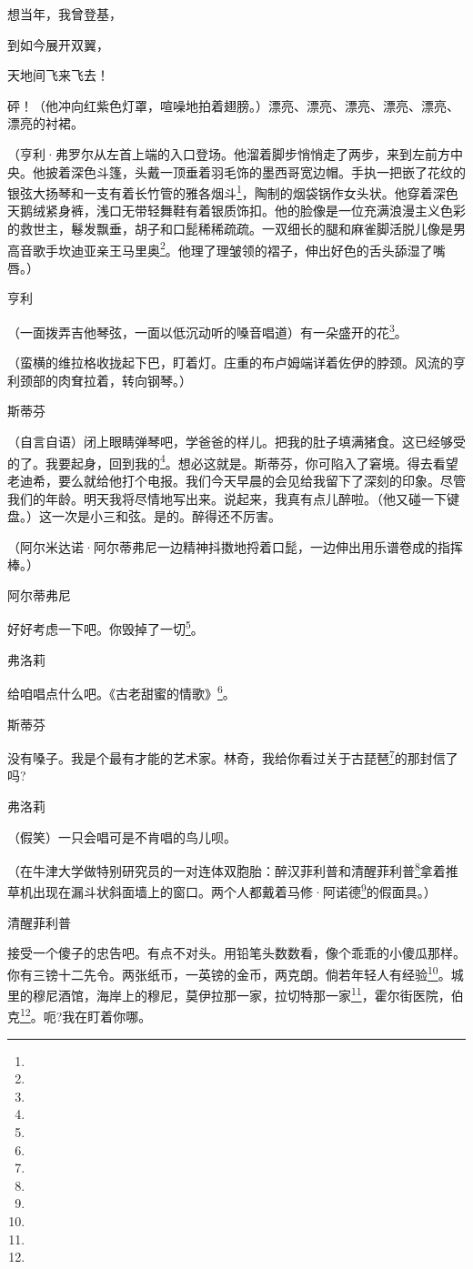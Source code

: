 \par 想当年，我曾登基，
\par 到如今展开双翼，
\par 天地间飞来飞去！
\par 砰！（他冲向红紫色灯罩，喧噪地拍着翅膀。）漂亮、漂亮、漂亮、漂亮、漂亮、漂亮的衬裙。
\par （亨利·弗罗尔从左首上端的入口登场。他溜着脚步悄悄走了两步，来到左前方中央。他披着深色斗篷，头戴一顶垂着羽毛饰的墨西哥宽边帽。手执一把嵌了花纹的银弦大扬琴和一支有着长竹管的雅各烟斗\footnote{}，陶制的烟袋锅作女头状。他穿着深色天鹅绒紧身裤，浅口无带轻舞鞋有着银质饰扣。他的脸像是一位充满浪漫主义色彩的救世主，鬈发飘垂，胡子和口髭稀稀疏疏。一双细长的腿和麻雀脚活脱儿像是男高音歌手坎迪亚亲王马里奥\footnote{}。他理了理皱领的褶子，伸出好色的舌头舔湿了嘴唇。）
\par 亨利
\par （一面拨弄吉他琴弦，一面以低沉动听的嗓音唱道）有一朵盛开的花\footnote{}。
\par （蛮横的维拉格收拢起下巴，盯着灯。庄重的布卢姆端详着佐伊的脖颈。风流的亨利颈部的肉耷拉着，转向钢琴。）
\par 斯蒂芬
\par （自言自语）闭上眼睛弹琴吧，学爸爸的样儿。把我的肚子填满猪食。这已经够受的了。我要起身，回到我的\footnote{}。想必这就是。斯蒂芬，你可陷入了窘境。得去看望老迪希，要么就给他打个电报。我们今天早晨的会见给我留下了深刻的印象。尽管我们的年龄。明天我将尽情地写出来。说起来，我真有点儿醉啦。（他又碰一下键盘。）这一次是小三和弦。是的。醉得还不厉害。
\par （阿尔米达诺·阿尔蒂弗尼一边精神抖擞地捋着口髭，一边伸出用乐谱卷成的指挥棒。）
\par 阿尔蒂弗尼
\par 好好考虑一下吧。你毁掉了一切\footnote{}。
\par 弗洛莉
\par 给咱唱点什么吧。《古老甜蜜的情歌》\footnote{}。
\par 斯蒂芬
\par 没有嗓子。我是个最有才能的艺术家。林奇，我给你看过关于古琵琶\footnote{}的那封信了吗?
\par 弗洛莉
\par （假笑）一只会唱可是不肯唱的鸟儿呗。
\par （在牛津大学做特别研究员的一对连体双胞胎：醉汉菲利普和清醒菲利普\footnote{}拿着推草机出现在漏斗状斜面墙上的窗口。两个人都戴着马修·阿诺德\footnote{}的假面具。）
\par 清醒菲利普
\par 接受一个傻子的忠告吧。有点不对头。用铅笔头数数看，像个乖乖的小傻瓜那样。你有三镑十二先令。两张纸币，一英镑的金币，两克朗。倘若年轻人有经验\footnote{}。城里的穆尼酒馆，海岸上的穆尼，莫伊拉那一家，拉切特那一家\footnote{}，霍尔街医院，伯克\footnote{}。呃?我在盯着你哪。
